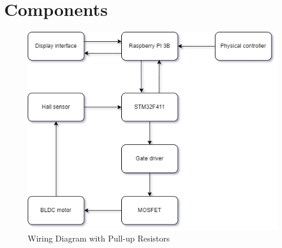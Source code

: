\section{Components}
\begin{figure}[H]
    \centering
    \includegraphics[width=1\textwidth]{img/DrawIO/Componentdiagram.png}
    \caption{Wiring Diagram with Pull-up Resistors}
    \label{fig:hall_sensor_wiring_diagram}
\end{figure}